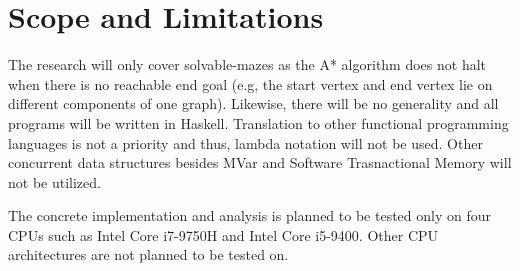\section{Scope and Limitations}

The research will only cover solvable-mazes as the A* algorithm does not halt when there is no reachable end goal (e.g,
the start vertex and end vertex lie on different components of one graph).\cite{HartNilssonRaphael1968} Likewise, there will be no generality
and all programs will be written in Haskell. Translation to other functional programming languages is not a priority and thus,
lambda notation will not be used. Other concurrent data structures besides MVar and Software Trasnactional Memory will not be utilized.

The concrete implementation and analysis is planned to be tested only on four CPUs such as Intel Core i7-9750H and Intel Core i5-9400.
Other CPU architectures are not planned to be tested on.